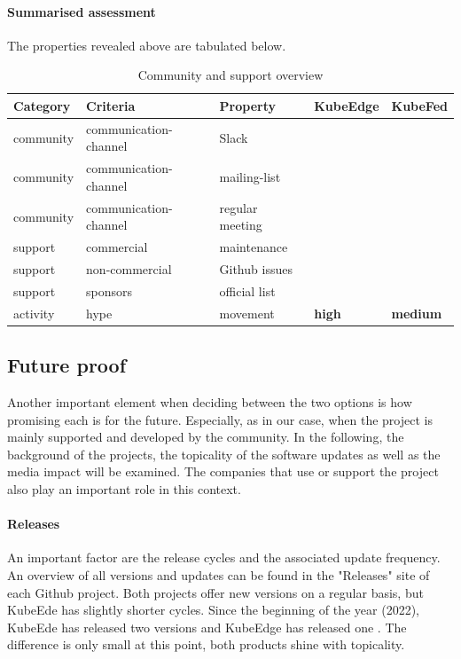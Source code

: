 \documentclass[MSC,Master,english]{twbook}%
\newcommand{\cmark}{\ding{51}}%
\newcommand{\xmark}{\ding{55}}%
\begin{document}
\paragraph{Summarised assessment} The properties revealed above are tabulated below. 
\begin{table}[ht]
    \begin{center}
        \begin{tabular}{|l|l|l|l|l|}
            \hline
            Category & Criteria & Property & \textbf{KubeEdge} & \textbf{KubeFed} \\
            \hline
            community & communication-channel & Slack & \cmark & \cmark \\
            community & communication-channel & mailing-list & \cmark & \cmark \\
            community & communication-channel & regular meeting & \cmark & \cmark \\
            support & commercial & maintenance & \xmark & \xmark \\
            support & non-commercial & Github issues & \cmark & \cmark \\
            support & sponsors & official list & \cmark & \xmark \\
            activity & hype & movement & \textbf{high} & \textbf{medium} \\
            \hline
        \end{tabular}
        \caption{Community and support overview}
        \label{tab:cs-overview}
    \end{center}
\end{table}

\subsection{Future proof}
Another important element when deciding between the two options is how promising each is for the future. Especially, as in our case, when the project is mainly supported and developed by the community. In the following, the background of the projects, the topicality of the software updates as well as the media impact will be examined. The companies that use or support the project also play an important role in this context.

\paragraph{Releases} An important factor are the release cycles and the associated update frequency. An overview of all versions and updates can be found in the "Releases" site of each Github project. Both projects offer new versions on a regular basis, but KubeEde has slightly shorter cycles. Since the beginning of the year (2022), KubeEde has released two versions and KubeEdge has released one \cite{ke-releases-gh}\cite{kf-releases-gh}. The difference is only small at this point, both products shine with topicality.
\end{document}
